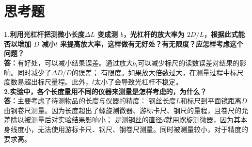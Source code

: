 \documentclass{article}
\def\kong{\hspace*{2em}}
\begin{document}
\section{思考题}
    \kong \textbf{1.利用光杠杆把测微小长度$\Delta L$ 变成测 $b$，光杠杆的放大率为 $2D/L$，根据此式能否以增加 $D$ 减小$l$
	来提高放大率，这样做有无好处？有无限度？应怎样考虑这个问题？}\\
    \kong \textbf{答：}有好处，可以减小结果误差。通过放大$b_i$可以减少标尺的读数误差对结果的影响。同时减少了$\Delta D/D$的误差；
    有限度。如果放大倍数过大，在测量过程中标尺度数易超出标尺量程。此外，$l$太小了会导致光杠杆不稳定。\\
    \kong \textbf{2.实验中，各个长度量用不同的仪器来测量是怎样考虑的，为什么？}\\
    \kong \textbf{答：}主要考虑了待测物品的长度与仪器的精度：
    钢丝长度$L$和标尺到平面镜距离$D$由钢卷尺测量。因为长度超出了螺旋测微器、游标卡尺、钢尺的量程，且卷尺的允差除以被测量后对实验结果影响小；
    是测钢丝的直径$d$就用螺旋测微器，因为其本身线度小，无法使用游标卡尺、钢尺、钢卷尺测量。同时被测量较小，对于精度的要求高。
      
\end{document}
